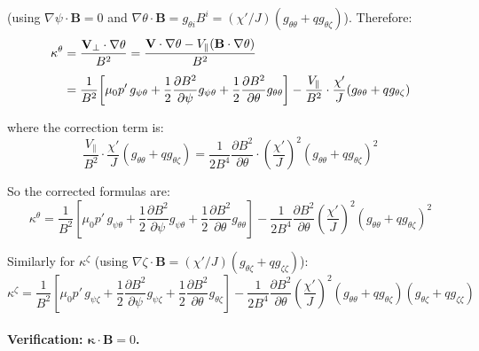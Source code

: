 \documentclass[12pt,a4paper]{article}
\begin{document}
(using $\nabla\psi\cdot\mathbf{B}=0$ and $\nabla\theta\cdot\mathbf{B} = g_{\theta i}B^i = (\chi'/J)(g_{\theta\theta}+qg_{\theta\zeta})$). Therefore:
\begin{align}
    \kappa^\theta &= \frac{\mathbf{V}_\perp\cdot\nabla\theta}{B^2} = \frac{\mathbf{V}\cdot\nabla\theta - V_\parallel(\mathbf{B}\cdot\nabla\theta)}{B^2} \notag\\[4pt]
    &= \frac{1}{B^2}\!\left[\mu_0 p'\,g_{\psi\theta} + \frac{1}{2}\frac{\partial B^2}{\partial\psi}g_{\psi\theta} + \frac{1}{2}\frac{\partial B^2}{\partial\theta}g_{\theta\theta}\right]
    - \frac{V_\parallel}{B^2}\cdot\frac{\chi'}{J}(g_{\theta\theta}+qg_{\theta\zeta})
    \label{eq:kappa_theta_correct}
\end{align}

where the correction term is:
\begin{equation}
    \frac{V_\parallel}{B^2}\cdot\frac{\chi'}{J}(g_{\theta\theta}+qg_{\theta\zeta})
    = \frac{1}{2B^4}\frac{\partial B^2}{\partial\theta}\cdot\left(\frac{\chi'}{J}\right)^2(g_{\theta\theta}+qg_{\theta\zeta})^2
    \label{eq:kappa_theta_correction}
\end{equation}

So the corrected formulas are:
\begin{equation}
    \boxed{\kappa^\theta = \frac{1}{B^2}\!\left[\mu_0 p'\,g_{\psi\theta} + \frac{1}{2}\frac{\partial B^2}{\partial\psi}g_{\psi\theta} + \frac{1}{2}\frac{\partial B^2}{\partial\theta}g_{\theta\theta}\right]
    - \frac{1}{2B^4}\frac{\partial B^2}{\partial\theta}\!\left(\frac{\chi'}{J}\right)^2\!(g_{\theta\theta}+qg_{\theta\zeta})^2}
    \label{eq:kappa_theta}
\end{equation}

Similarly for $\kappa^\zeta$ (using $\nabla\zeta\cdot\mathbf{B} = (\chi'/J)(g_{\theta\zeta}+qg_{\zeta\zeta})$):
\begin{equation}
    \boxed{\kappa^\zeta = \frac{1}{B^2}\!\left[\mu_0 p'\,g_{\psi\zeta} + \frac{1}{2}\frac{\partial B^2}{\partial\psi}g_{\psi\zeta} + \frac{1}{2}\frac{\partial B^2}{\partial\theta}g_{\theta\zeta}\right]
    - \frac{1}{2B^4}\frac{\partial B^2}{\partial\theta}\!\left(\frac{\chi'}{J}\right)^2\!(g_{\theta\theta}+qg_{\theta\zeta})(g_{\theta\zeta}+qg_{\zeta\zeta})}
    \label{eq:kappa_zeta}
\end{equation}

\paragraph{Verification: $\bm{\kappa}\cdot\mathbf{B} = 0$.}
\end{document}
